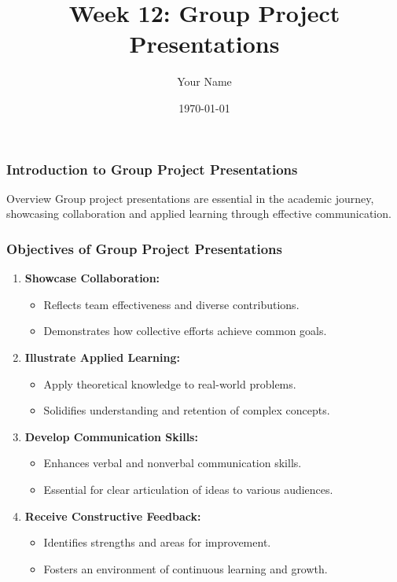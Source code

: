 \documentclass{beamer}
\title{Week 12: Group Project Presentations}
\author{Your Name}
\institute{Your Institution}
\date{\today}
\begin{document}
\frame{\titlepage}

\begin{frame}[fragile]
    \frametitle{Introduction to Group Project Presentations}
    \begin{block}{Overview}
        Group project presentations are essential in the academic journey, showcasing collaboration and applied learning through effective communication.
    \end{block}
\end{frame}

\begin{frame}[fragile]
    \frametitle{Objectives of Group Project Presentations}
    \begin{enumerate}
        \item \textbf{Showcase Collaboration:}
            \begin{itemize}
                \item Reflects team effectiveness and diverse contributions.
                \item Demonstrates how collective efforts achieve common goals.
            \end{itemize}
        
        \item \textbf{Illustrate Applied Learning:}
            \begin{itemize}
                \item Apply theoretical knowledge to real-world problems.
                \item Solidifies understanding and retention of complex concepts.
            \end{itemize}
        
        \item \textbf{Develop Communication Skills:}
            \begin{itemize}
                \item Enhances verbal and nonverbal communication skills.
                \item Essential for clear articulation of ideas to various audiences.
            \end{itemize}

        \item \textbf{Receive Constructive Feedback:}
            \begin{itemize}
                \item Identifies strengths and areas for improvement.
                \item Fosters an environment of continuous learning and growth.
            \end{itemize}
    \end{enumerate}
\end{frame}
\end{document}
